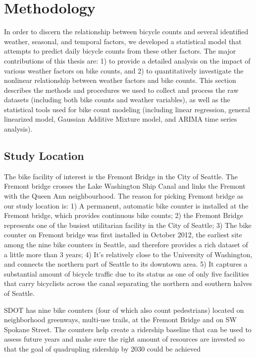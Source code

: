 \documentclass [11pt, proquest] {uwthesis}[2015/03/03]
\begin{document}
 
\chapter{Methodology}


In order to discern the relationship between bicycle counts and several identified weather, seasonal, and temporal factors, we
developed a statistical model that attempts to predict daily bicycle counts from these other factors. The major contributions of this thesis are: 1) to provide a detailed analysis on the impact of various weather factors on bike counts, and 2) to quantitatively investigate the nonlinear relationship between weather factors and bike counts. This section describes the methods
and procedures we used to collect and process the raw datasets (including both bike counts and weather variables), as well as the statistical tools used for bike count modeling (including linear regression, general linearized model, Gaussian Additive Mixture model, and ARIMA time series analysis). 

\section{Study Location}
The bike facility of interest is the Fremont Bridge in the City of Seattle. The Fremont bridge crosses the Lake Washington Ship Canal and links the Fremont with the Queen Ann neighbourhood. The reason for picking Fremont bridge as our study location is: 1) A permanent, automatic bike counter is installed at the Fremont bridge, which provides continuous bike counts; 2) the Fremont Bridge represents one of the busiest utilitarian facility in the City of Seattle; 3) The bike counter on Fremont bridge was first installed in October 2012, the earliest site among the nine bike counters in Seattle, and therefore provides a rich dataset of a little more than 3 years; 4) It's relatively close to the University of Washington, and connects the northern part of Seattle to its downtown area. 5) It captures a substantial amount of bicycle traffic due to its status as one of only five facilities that carry bicyclists across the canal separating the northern and southern halves of Seattle.

SDOT has nine bike counters (four of which also count pedestrians) located on neighborhood greenways, multi-use trails, at the Fremont  Bridge and on SW Spokane Street. The counters help create a ridership baseline that can be used to assess future years and make sure the right amount of resources are invested so that the goal of quadrupling ridership by 2030 could be achieved~\cite{SDOT_BMP15}
\end{document}
